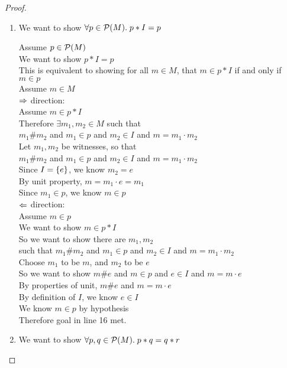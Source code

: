 \begin{proof}
\begin{enumerate}
\item We want to show $\forall p \in \mathcal{P}(M).\; p * I = p$
  \begin{tabbedproof}
    \oo Assume $p \in \mathcal{P}(M)$ \\
    \ooo We want to show $p * I = p$ \\ 
    \ooo This is equivalent to showing for all $m \in M$, that $m \in p * I$ if and only if $m \in p$ \\
    \ooo Assume $m \in M$ \\
    \oooo $\Rightarrow$ direction: \\
    \ooooo Assume $m \in p * I$ \\
    \ooooo Therefore $\exists m_1, m_2 \in M$ such that \\
    \ooooox $m_1 \# m_2$ and $m_1 \in p$ and $m_2 \in I$ and $m = m_1 \cdot m_2$\\
    \ooooo Let $m_1, m_2$ be witnesses, so that \\
    \oooooo $m_1 \# m_2$ and $m_1 \in p$ and $m_2 \in I$ and $m = m_1 \cdot m_2$\\
    \oooooo Since $I = \{{e}\}$, we know $m_2 = e$ \\
    \oooooo By unit property, $m = m_1 \cdot e = m_1$ \\
    \oooooo Since $m_1 \in p$, we know $m \in p$ \\
    \ooo $\Leftarrow$ direction: \\
    \oooo Assume $m \in p$ \\
    \ooooo We want to show $m \in p * I$ \\ 
    \ooooo So we want to show there are $m_1, m_2$ \\
    \ooooox such that $m_1 \# m_2$ and $m_1 \in p$ and $m_2 \in I$ and $m = m_1 \cdot m_2$ \\
    \ooooo Choose $m_1$ to be $m$, and $m_2$ to be $e$ \\
    \ooooo So we want to show $m \# e$ and $m \in p$ and $e \in I$ and $m = m \cdot e$ \\
    \ooooo By properties of unit, $m \# e$ and $m = m \cdot e$ \\
    \ooooo By definition of $I$, we know $e \in I$ \\
    \ooooo We know $m \in p$ by hypothesis \\
    \ooooo Therefore goal in line 16 met. \\ 
  \end{tabbedproof}

\item We want to show $\forall p, q \in \mathcal{P}(M).\; p * q = q * r$


\end{enumerate}
\end{proof}

